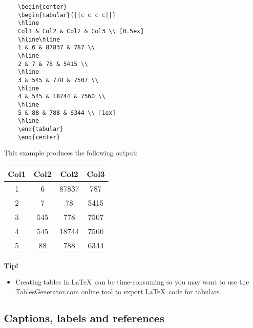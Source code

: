 \begin{tcolorbox}
\begin{verbatim}
    \begin{center}
    \begin{tabular}{||c c c c||} 
    \hline
    Col1 & Col2 & Col2 & Col3 \\ [0.5ex] 
    \hline\hline
    1 & 6 & 87837 & 787 \\ 
    \hline
    2 & 7 & 78 & 5415 \\
    \hline
    3 & 545 & 778 & 7507 \\
    \hline
    4 & 545 & 18744 & 7560 \\
    \hline
    5 & 88 & 788 & 6344 \\ [1ex] 
    \hline
    \end{tabular}
    \end{center}
\end{verbatim}
\end{tcolorbox}

This example produces the following output:

\begin{mdframed}
    \begin{center}
    \begin{tabular}{||c c c c||} 
    \hline
    Col1 & Col2 & Col2 & Col3 \\ [0.5ex] 
    \hline\hline
    1 & 6 & 87837 & 787 \\ 
    \hline
    2 & 7 & 78 & 5415 \\
    \hline
    3 & 545 & 778 & 7507 \\
    \hline
    4 & 545 & 18744 & 7560 \\
    \hline
    5 & 88 & 788 & 6344 \\ [1ex] 
    \hline
    \end{tabular}
    \end{center}
\end{mdframed}

\textbf{Tip!}

\begin{itemize}
    \item Creating tables in \LaTeX\ can be time-consuming so you may want to use the \url{TablesGenerator.com} online tool to export \LaTeX\ code for tabulars.
\end{itemize}

\subsection{Captions, labels and references}

